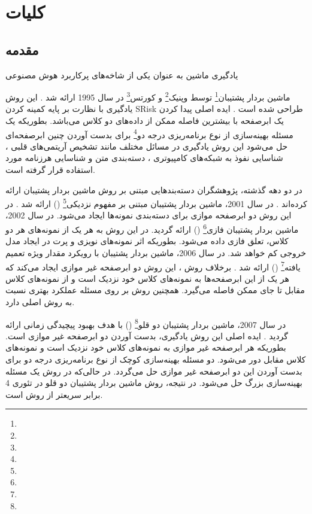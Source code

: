\chapter{کلیات} \label{ch:1}
\section{مقدمه} \label{sec:1:1}
یادگیری ماشین به عنوان  یکی از شاخه‌های پرکاربرد هوش مصنوعی

\newpage

ماشین بردار پشتیبان\footnote{} توسط وپنیک\footnote{} و کورتس\footnote{} در سال 1995 ارائه شد \cite{vapnik1995}. این روش یادگیری با نظارت بر پایه کمینه کردن \gls{SRisk} طراحی شده است \cite{vapnik1998}. ایده اصلی  پیدا کردن یک ابرصفحه با بیشترین فاصله ممکن از داده‌های دو کلاس می‌باشد. بطوریکه یک مسئله  بهینه‌سازی از نوع برنامه‌ریزی درجه دو\footnote{} برای بدست آوردن چنین ابرصفحه‌ای حل می‌شود این روش یادگیری در مسائل مختلف مانند تشخیص آریتمی‌های قلبی \cite{nasiri2009}، شناسایی نفوذ به شبکه‌های کامپیوتری \cite{raman2017}، دسته‌بندی متن\cite{lee2012} و شناسایی هرزنامه \cite{zoubi2018} مورد استفاده قرار گرفته است.

در دو دهه گذشته، پژوهشگران دسته‌بندهایی مبتنی بر روش ماشین بردار پشتیبان ارائه کرده‌اند \cite{nayak2015}. در سال 2001، ماشین بردار پشتیبان مبتنی بر مفهوم نزدیکی\footnote{}  () ارائه شد \cite{mang2001}. در این روش دو ابرصفحه موازی برای دسته‌بندی نمونه‌ها ایجاد می‌شود. در سال 2002، ماشین بردار پشتیبان فازی\footnote{}  () \cite{lin2002} ارائه گردید. در این روش به هر یک از نمونه‌های هر دو کلاس، تعلق فازی داده می‌شود. بطوریکه اثر نمونه‌های نویزی و پرت در ایجاد مدل خروجی کم خواهد شد. در سال 2006، ماشین بردار پشتیبان با رویکرد مقدار ویژه تعمیم یافته\footnote{}  () ارائه شد \cite{mang2006}. برخلاف روش ، این روش دو ابرصفحه غیر موازی ایجاد می‌کند که هر یک از این ابرصفحه‌ها به نمونه‌های کلاس خود نزدیک است و از نمونه‌های کلاس مقابل تا جای ممکن فاصله می‌گیرد. همچنین روش  بر روی مسئله  عملکرد بهتری نسبت به روش  اصلی دارد.

در سال 2007، ماشین بردار پشتیبان دو قلو\footnote{}  () با هدف بهبود پیچیدگی زمانی  ارائه گردید \cite{jayadeva2007}. ایده اصلی این روش یادگیری، بدست آوردن دو ابرصفحه غیر موازی است. بطوریکه هر ابرصفحه غیر موازی به نمونه‌های کلاس خود نزدیک است و نمونه‌های کلاس مقابل دور می‌شود. دو مسئله بهینه‌سازی کوچک از نوع برنامه‌ریزی درجه دو برای بدست آوردن این دو ابرصفحه غیر موازی حل می‌گردد. در حالی‌که در روش  یک مسئله بهینه‌سازی بزرگ حل می‌شود. در نتیجه، روش ماشین بردار پشتیبان دو قلو در تئوری 4 برابر سریعتر از روش  است.

